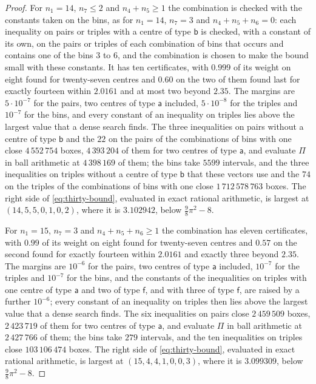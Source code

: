 \documentclass[11pt,reqno]{amsart}
\renewcommand{\_}{\origunderscore\allowbreak}
\numberwithin{equation}{section}
\theoremstyle{plain}
\theoremstyle{definition}
\theoremstyle{remark}
\begin{document}
\begin{proof}
For $n_1=14$, $n_7\le2$ and $n_4+n_5\ge1$ the combination is checked with
the constants taken on the bins, as for $n_1=14$, $n_7=3$ and
$n_4+n_5+n_6=0$: each inequality on pairs or triples with a centre of type
$\mathsf b$ is checked, with a constant of its own, on the pairs or
triples of each combination of bins that occurs and contains one of the
bins $3$ to $6$, and the combination is chosen to make the bound small with
these constants. It has ten certificates, with $0.999$ of its weight on
eight found for twenty-seven centres and $0.60$ on the two of them found
last for exactly fourteen within $2.0161$ and at most two beyond $2.35$.
The margins are $5\cdot10^{-7}$ for the pairs, two centres of type
$\mathsf a$ included, $5\cdot10^{-8}$ for the triples and $10^{-7}$ for
the bins, and every constant of an inequality on triples lies above the
largest value that a dense search finds. The three inequalities on pairs
without a centre of type $\mathsf b$ and the $22$ on the pairs of the
combinations of bins with one close $4\,552\,754$ boxes, $4\,393\,204$ of
them for two centres of type $\mathsf a$, and evaluate $\Pi$ in ball
arithmetic at $4\,398\,169$ of them; the bins take $5599$ intervals, and
the three inequalities on triples without a centre of type $\mathsf b$
that these vectors use and the $74$ on the triples of the combinations of
bins with one close $1\,712\,578\,763$ boxes. The right side of
\eqref{eq:thirty-bound}, evaluated in exact rational arithmetic, is
largest at $(14,5,5,0,1,0,2)$, where it is $3.102942$, below
$\frac98\pi^2-8$.

For $n_1=15$, $n_7=3$ and $n_4+n_5+n_6\ge1$ the combination has eleven
certificates, with $0.99$ of its weight on eight found for twenty-seven
centres and $0.57$ on the second found for exactly fourteen within
$2.0161$ and exactly three beyond $2.35$. The margins are $10^{-6}$ for
the pairs, two centres of type $\mathsf a$ included, $10^{-7}$ for the
triples and $10^{-7}$ for the bins, and the constants of the inequalities
on triples with one centre of type $\mathsf a$ and two of type $\mathsf f$,
and with three of type $\mathsf f$, are raised by a further $10^{-6}$;
every constant of an inequality on triples then lies above the largest
value that a dense search finds. The six inequalities on pairs close
$2\,459\,509$ boxes, $2\,423\,719$ of them for two centres of type
$\mathsf a$, and evaluate $\Pi$ in ball arithmetic at $2\,427\,766$ of
them; the bins take $279$ intervals, and the ten inequalities on triples
close $103\,106\,474$ boxes. The right side of \eqref{eq:thirty-bound},
evaluated in exact rational arithmetic, is largest at $(15,4,4,1,0,0,3)$,
where it is $3.099309$, below $\frac98\pi^2-8$.


\end{proof}
\end{document}
